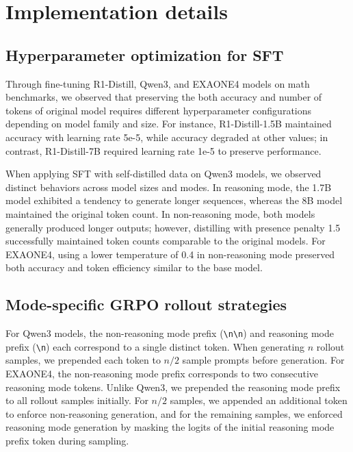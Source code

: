 \section{Implementation details}

\subsection{Hyperparameter optimization for SFT} 

Through fine-tuning R1-Distill, Qwen3, and EXAONE4 models on math benchmarks, we observed that preserving the both accuracy and number of tokens of original model requires different hyperparameter configurations depending on model family and size. For instance, R1-Distill-1.5B maintained accuracy with learning rate 5e-5, while accuracy degraded at other values; in contrast, R1-Distill-7B required learning rate 1e-5 to preserve performance.

When applying SFT with self-distilled data on Qwen3 models, we observed distinct behaviors across model sizes and modes. In reasoning mode, the 1.7B model exhibited a tendency to generate longer sequences, whereas the 8B model maintained the original token count. In non-reasoning mode, both models generally produced longer outputs; however, distilling with presence penalty 1.5 successfully maintained token counts comparable to the original models. For EXAONE4, using a lower temperature of 0.4 in non-reasoning mode preserved both accuracy and token efficiency similar to the base model.

\subsection{Mode-specific GRPO rollout strategies} 

For Qwen3 models, the non-reasoning mode prefix (\texttt{\textbackslash n\textbackslash n}) and reasoning mode prefix (\texttt{\textbackslash n}) each correspond to a single distinct token. When generating $n$ rollout samples, we prepended each token to $n/2$ sample prompts before generation. For EXAONE4, the non-reasoning mode prefix corresponds to two consecutive reasoning mode tokens. Unlike Qwen3, we prepended the reasoning mode prefix to all rollout samples initially. For $n/2$ samples, we appended an additional token to enforce non-reasoning generation, and for the remaining samples, we enforced reasoning mode generation by masking the logits of the initial reasoning mode prefix token during sampling.

